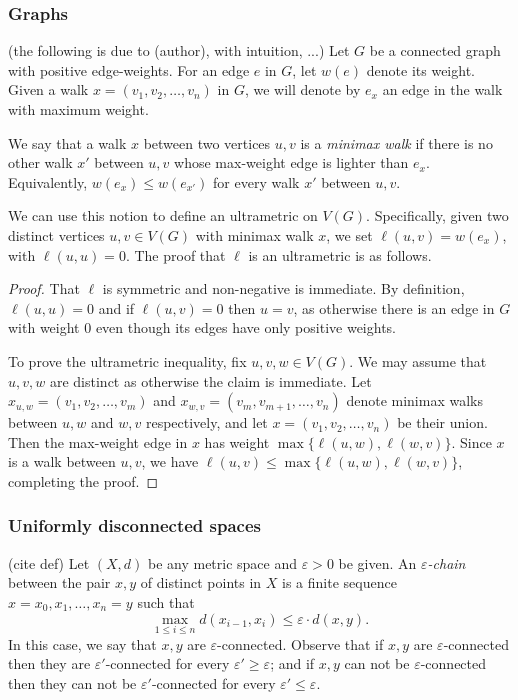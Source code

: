 \subsubsection{Graphs} (the following is due to (author), with intuition, ...) Let \( G \) be a connected graph with positive edge-weights. For an edge \( e \) in \( G \), let \( w(e) \) denote its weight. Given a walk \( x = (v_1, v_2, \hdots , v_{n}) \) in \( G \), we will denote by \( e_{x} \) an edge in the walk with maximum weight.

We say that a walk \( x \) between two vertices \( u , v \) is a \emph{minimax walk} if there is no other walk \( x' \) between \( u,v \) whose max-weight edge is lighter than \( e_{x}  \). Equivalently, \( w(e_{x}) \leq w(e_{x'}) \) for every walk \( x' \) between \( u,v \).

We can use this notion to define an ultrametric on \( V(G) \). Specifically, given two distinct vertices \( u,v \in V(G) \) with minimax walk \( x \), we set \( \ell(u, v) = w(e_{x}) \), with \( \ell(u,u) = 0 \). The proof that \( \ell \) is an ultrametric is as follows.

\begin{proof}
That \( \ell \) is symmetric and non-negative is immediate. By definition, \( \ell(u, u) = 0 \) and if \( \ell(u, v) = 0 \) then \( u = v \), as otherwise there is an edge in \( G \) with weight 0 even though its edges have only positive weights.

To prove the ultrametric inequality, fix \( u, v, w \in V(G) \). We may assume that \( u,v,w \) are distinct as otherwise the claim is immediate. Let \( x_{u,w} = (v_1, v_2, \hdots , v_{m}) \) and \( x_{w,v} = (v_{m}, v_{m+1} , \hdots , v_{n}) \) denote minimax walks between \( u,w \) and \( w,v \) respectively, and let \( x = (v_1, v_2, \hdots , v_{n}) \) be their union. Then the max-weight edge in \( x \) has weight \( \max \{ \ell (u, w), \ell (w,v) \}  \). Since \( x \) is a walk between \( u,v \), we have \( \ell (u, v) \leq \max \{ \ell (u,w), \ell (w,v) \}  \), completing the proof.
\end{proof}

\subsubsection{Uniformly disconnected spaces} (cite def) Let \( (X,d) \) be any metric space and \( \varepsilon > 0 \) be given. An \emph{\( \varepsilon  \)-chain} between the pair \( x,y \) of distinct points in \( X \) is a finite sequence \( x = x_0 , x_1, \hdots , x_{n} = y  \) such that \[\max_{1 \leq i \leq n}  d(x_{i-1} , x_{i})  \leq \varepsilon \cdot d(x,y). \] In this case, we say that \( x, y \) are \( \varepsilon  \)-connected. Observe that if \( x, y \) are \( \varepsilon  \)-connected then they are \( \varepsilon ' \)-connected for every \( \varepsilon ' \geq \varepsilon  \); and if \( x, y \) can not be \( \varepsilon  \)-connected then they can not be \( \varepsilon ' \)-connected for every \( \varepsilon ' \leq \varepsilon  \).


